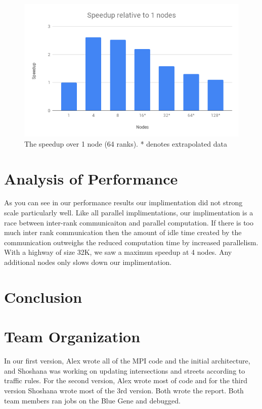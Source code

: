 \documentclass[10pt,a4paper]{article}
\begin{document}
\begin{figure}[H]
    \centering
    \includegraphics[scale=0.3]{speedup.png}
    \caption{The speedup over 1 node (64 ranks). * denotes extrapolated data}
    \label{fig:my_label}
\end{figure}


\section{Analysis of Performance}

As you can see in our performance results our implimentation did not strong scale
particularly well. Like all parallel implimentations, our implimentation is a race between inter-rank communicaiton and parallel computation. If there is too much inter rank communication then the amount of idle time created by the communication outweighs the reduced computation time by increased parallelism. With a highway of size 32K, we saw a maximun speedup at 4 nodes. Any additional nodes only slows down our implimentation.

\section{Conclusion}

\section{Team Organization}

In our first version, Alex wrote all of the MPI code and the initial architecture, and Shoshana was working on updating intersections and streets according to traffic rules. For the second version, Alex wrote most of code and for the third version Shoshana wrote most of the 3rd version. Both wrote the report. Both team members ran jobs on the Blue Gene and debugged.



\end{document}
